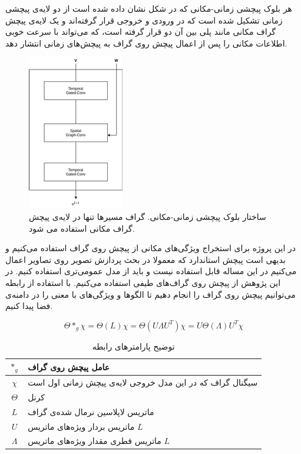 \documentclass{article}
\begin{document}
هر بلوک پیچشی زمانی-مکانی که در شکل  نشان داده شده است از دو لایه‌ی پیچشی زمانی تشکیل شده است که در ورودی و خروجی قرار گرفته‌اند
و یک لایه‌ی پیچش گراف مکانی مانند پلی بین آن دو قرار گرفته است، که می‌تواند با سرعت خوبی اطلاعات مکانی را پس از اعمال پیچش روی گراف
به پیچش‌های زمانی انتشار دهد.

\begin{figure}
  \includegraphics{./images/inner-blocks.png}
  \centering
  \caption{
ساختار بلوک پیچشی زمانی-مکانی. گراف مسیرها تنها در لایه‌ی پیچش گراف مکانی استفاده می شود. 
  }
  \label{fig:inner-blocks}
\end{figure}

در این پروژه برای استخراج ویژگی‌های مکانی از پیچش روی گراف استفاده می‌کنیم و بدیهی است پیچش استاندارد که معمولا
در بحث پردازش تصویر روی تصاویر اعمال می‌کنیم در این مساله قابل استفاده نیست و باید از مدل عمومی‌تری استفاده کنیم.
در این پژوهش از پیچش روی گراف‌های طیفی استفاده می‌کنیم. 
با استفاده از رابطه  می‌توانیم پیچش روی گراف را انجام دهیم تا الگوها و ویژگی‌های با معنی را در دامنه‌ی فضا پیدا کنیم.

\begin{equation}
  \Theta *_{g} \chi = \Theta(L)\chi = \Theta(U \Lambda U^{T})\chi = U\Theta(\Lambda)U^{T}\chi
  \label{eq:convolution}
\end{equation}

\begin{table}[h]
  \centering
  \caption{توضیح پارامترهای رابطه }
  \begin{tabular}{|c|p{}|}
    \hline
    $*_{g}$ & عامل پیچش روی گراف \\
    \hline
    $\chi$ & سیگنال گراف که در این مدل خروجی لایه‌ی پیچش زمانی اول است \\
    \hline
    $\Theta$ & کرنل \\
    \hline
    $L$ & ماتریس لاپلاسین نرمال شده‌ی گراف \\
    \hline
    $U$ & ماتریس بردار ویژه‌های ماتریس $L$ \\
    \hline
    $\Lambda$ & ماتریس قطری مقدار ویژه‌های ماتریس $L$ \\
    \hline
  \end{tabular}
  \label{tbl:distance}
\end{table}
\end{document}
